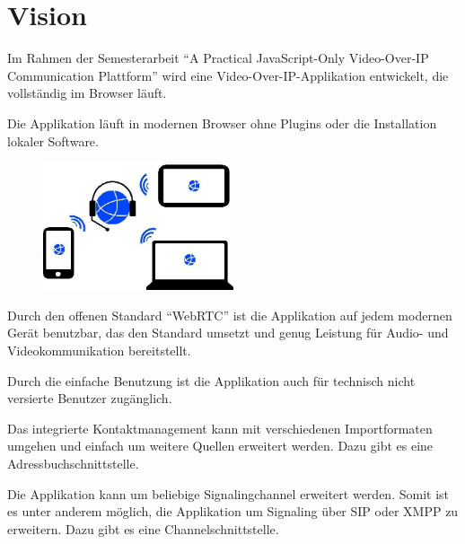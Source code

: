 \chapter{Vision}
	Im Rahmen der Semesterarbeit "`A Practical JavaScript-Only Video-Over-IP Communication Plattform"' wird eine
	Video-Over-IP-Applikation entwickelt, die vollständig im Browser läuft.
	
	Die Applikation läuft in modernen Browser ohne Plugins oder die Installation lokaler Software.
			
	\begin{figure}[H]
		\centering
		\includegraphics[width=0.5\textwidth]{../projektdokumentation/img/plattformUnabhaengigkeit.jpg}
		\label{plattformUnabhaengigkeit}
	\end{figure}
	
	Durch den offenen Standard "`WebRTC"' ist die Applikation auf jedem modernen Gerät benutzbar, das den Standard umsetzt und genug Leistung für Audio- und Videokommunikation bereitstellt.
	
	Durch die einfache Benutzung ist die Applikation auch für technisch nicht
	versierte Benutzer zugänglich.
	
	Das integrierte Kontaktmanagement kann mit verschiedenen Importformaten umgehen und einfach um weitere Quellen erweitert werden. Dazu gibt es eine Adressbuchschnittstelle.
	
	Die Applikation kann um beliebige Signalingchannel erweitert werden. Somit ist
	es unter anderem möglich, die Applikation um Signaling über SIP oder XMPP zu
	erweitern. Dazu gibt es eine Channelschnittstelle.
	
	
